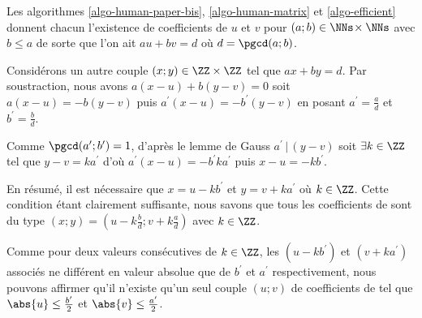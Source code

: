 Les algorithmes \ref{algo-human-paper-bis}, \ref{algo-human-matrix} et \ref{algo-efficient} donnent chacun l'existence de coefficients de \bb{} $u$ et $v$ pour $(a ; b) \in \NNs \!\times \NNs$ avec $b \leq a$ de sorte que l'on ait $a u + b v = d$ où $d = \pgcd(a ; b)$.


\medskip


Considérons un autre couple $(x ; y) \in \ZZ \times \ZZ$ tel que $a x + b y = d$. Par soustraction, nous avons $a(x - u) + b(y - v) = 0$ soit $a(x - u) = - b(y - v)$ puis $a^\prime(x - u) = - b^\prime(y - v)$ en posant $a^\prime = \frac{a}{d}$ et  $b^\prime = \frac{b}{d}$.


\medskip


Comme $\pgcd(a^\prime ; b^\prime) = 1$, d'après le lemme de Gauss $a^\prime \,|\, (y - v)$ soit $\exists k \in \ZZ$ tel que $y - v = k a^\prime$ d'où $a^\prime(x - u) = - b^\prime k a^\prime$ puis $x - u = - k b^\prime$. 


\medskip


En résumé, il est nécessaire que $x = u - k b^\prime$ et $y = v + k a^\prime$ où $k \in \ZZ$. Cette condition étant clairement suffisante, nous savons que tous les coefficients de \bb{} sont du type $(x ; y) = (u - k \frac{b}{d} ; v + k \frac{a}{d})$ avec $k \in \ZZ$.


\begin{remark}
	Comme pour deux valeurs consécutives de $k \in \ZZ$, les $(u - k b^\prime)$ et $(v + k a^\prime)$ associés ne différent en valeur absolue que de $b^\prime$ et $a^\prime$ respectivement, nous pouvons affirmer qu'il n'existe qu'un seul couple $(u ; v)$ de coefficients de \bb{} tel que $\abs{u} \leq \frac{b^\prime}{2}$ et $\abs{v} \leq \frac{a^\prime}{2}$.
\end{remark}
